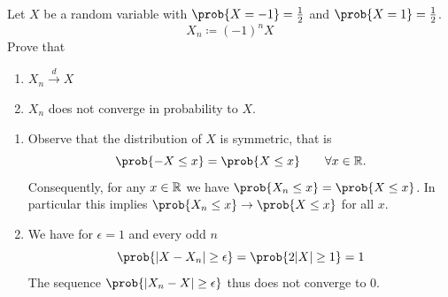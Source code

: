 \begin{exercise}[subtitle={Convergence in distribution but not probability \Coffeecup}]
    \label{ex: convergence in distribution but not in probability}
    Let \(X\) be a random variable with \(\prob{X=-1} = \frac12\) and \(\prob{X=1}=\frac12\).
    \[
        X_n \coloneq (-1)^n X
    \]
    Prove that
    \begin{enumerate}[label=(\alph*), noitemsep]
        \item\label{it: (conv in dist but not in prob) in dist} \(X_n \xrightarrow{d} X\)
        \item \label{it: (conv in dist but not in prob) not in prob}\(X_n\) does not converge in probability to \(X\).
    \end{enumerate}
\end{exercise}
\begin{solution}
\begin{enumerate}[wide=0pt]
    \item[\ref{it: (conv in dist but not in prob) in dist}]
    Observe that the distribution of \(X\) is symmetric, that is
    \[
        \prob{-X \le x} = \prob{X \le x} \qquad \forall x\in \real.
    \]
    Consequently, for any \(x \in \mathbb{R}\) we have \(\prob{X_n \le x} = \prob{X \le x}\).
    In particular this implies \(\prob{X_n \le x} \to \prob{X \le x}\) for all \(x\).

    \item[\ref{it: (conv in dist but not in prob) not in prob}]
    We have for \(\epsilon = 1\) and every odd \(n\)
    \[
        \prob{\abs{X - X_n} \ge \epsilon}
        = \prob{2\abs{X} \ge 1} = 1
    \]
    The sequence \(\prob{|X_n - X| \ge \epsilon}\) thus does not converge to \(0\).
    \qedhere
\end{enumerate}
\end{solution}

